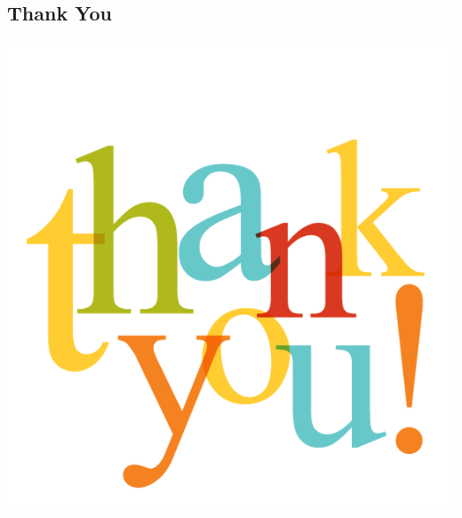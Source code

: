 \documentclass[xcolor=dvipsnames]{beamer}
\begin{document}
\subsection{Thank You}
\begin{frame}\frametitle{}
  \centering
    \includegraphics[scale=0.3]{images/thankyou}
    
\end{frame}

\end{document}
